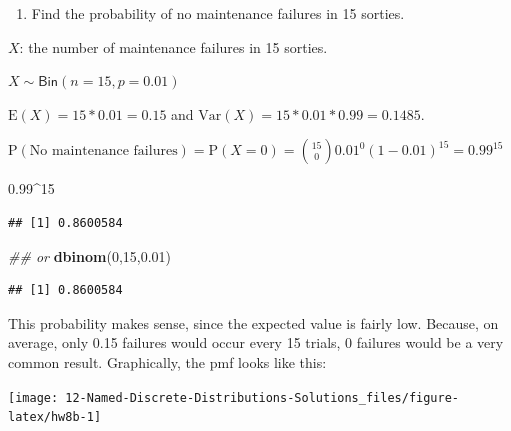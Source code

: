 \documentclass[
]{book}
\newenvironment{Shaded}{\begin{snugshade}}{\end{snugshade}}
\newcommand{\CommentTok}[1]{\textcolor[rgb]{0.56,0.35,0.01}{\textit{#1}}}
\newcommand{\DataTypeTok}[1]{\textcolor[rgb]{0.13,0.29,0.53}{#1}}
\newcommand{\DecValTok}[1]{\textcolor[rgb]{0.00,0.00,0.81}{#1}}
\newcommand{\FloatTok}[1]{\textcolor[rgb]{0.00,0.00,0.81}{#1}}
\newcommand{\KeywordTok}[1]{\textcolor[rgb]{0.13,0.29,0.53}{\textbf{#1}}}
\newcommand{\NormalTok}[1]{#1}
\newcommand{\OperatorTok}[1]{\textcolor[rgb]{0.81,0.36,0.00}{\textbf{#1}}}
\newcommand{\StringTok}[1]{\textcolor[rgb]{0.31,0.60,0.02}{#1}}
\providecommand{\tightlist}{%
  \setlength{\itemsep}{0pt}\setlength{\parskip}{0pt}}
\begin{document}
\begin{enumerate}
\def\labelenumi{\alph{enumi}.}
\tightlist
\item
  Find the probability of no maintenance failures in 15 sorties.
\end{enumerate}

\(X\): the number of maintenance failures in 15 sorties.

\(X\sim \textsf{Bin}(n=15,p=0.01)\)

\(\mbox{E}(X)=15*0.01=0.15\) and \(\mbox{Var}(X)=15*0.01*0.99=0.1485\).

\(\mbox{P}(\mbox{No maintenance failures})=\mbox{P}(X=0)={15\choose 0}0.01^0(1-0.01)^{15}=0.99^{15}\)

\begin{Shaded}
\begin{Highlighting}[]
\FloatTok{0.99}\OperatorTok{^}\DecValTok{15}
\end{Highlighting}
\end{Shaded}

\begin{verbatim}
## [1] 0.8600584
\end{verbatim}

\begin{Shaded}
\begin{Highlighting}[]
\CommentTok{## or }
\KeywordTok{dbinom}\NormalTok{(}\DecValTok{0}\NormalTok{,}\DecValTok{15}\NormalTok{,}\FloatTok{0.01}\NormalTok{)}
\end{Highlighting}
\end{Shaded}

\begin{verbatim}
## [1] 0.8600584
\end{verbatim}

This probability makes sense, since the expected value is fairly low. Because, on average, only 0.15 failures would occur every 15 trials, 0 failures would be a very common result. Graphically, the pmf looks like this:

\begin{Shaded}
\end{Shaded}

\begin{center}\texttt{[image: 12-Named-Discrete-Distributions-Solutions\_files/figure-latex/hw8b-1]} \end{center}
\end{document}
